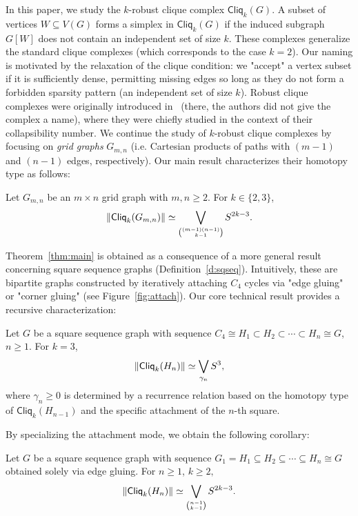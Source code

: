 \documentclass[a4paper, v2021]{lipics-v2021}
\theoremstyle{plain}
\theoremstyle{definition}
\newcommand{\Cliq}[2]{\mathsf{Cliq}_{#1}(#2)}
\DeclarePairedDelimiter{\gr}{\lVert}{\rVert}
\begin{document}
In this paper, we study the $k$-robust clique complex $\Cliq{k}{G}$. A subset of vertices $W\subseteq V(G)$ forms a simplex in $\Cliq{k}{G}$ if the induced subgraph $G[W]$ does not contain an independent set of size $k$. These complexes generalize the standard clique complexes (which corresponds to the case $k=2$).
Our naming is motivated by the relaxation of the clique condition: we "accept" a vertex subset if it is sufficiently dense, permitting missing edges so long as they do not form a forbidden sparsity pattern (an independent set of size $k$). Robust clique complexes were originally introduced in~\cite{KimL2022} (there, the authors did not give the complex a name), where they were chiefly studied in the context of their collapsibility number.
We continue the study of $k$-robust clique complexes by focusing on \emph{grid graphs} $G_{m,n}$ (i.e. Cartesian products of paths with $(m-1)$ and $(n-1)$ edges, respectively). Our main result characterizes their homotopy type as follows:

\begin{theorem}\label{thm:main}
Let $G_{m,n}$ be an $m \times n$ grid graph with $m, n \geq 2$. For  $ k\in \{2,3\}$,
\[
 \gr{\Cliq{k}{G_{m,n}}} \simeq \bigvee_{
    \binom{(m-1)(n-1)}{k-1}} S^{2k-3}.
\]
\end{theorem}

Theorem~\ref{thm:main} is obtained as a consequence of a more general result concerning square sequence graphs (Definition~\ref{d:sqseq}). Intuitively, these are bipartite graphs constructed by iteratively attaching $C_4$ cycles via "edge gluing" or "corner gluing" (see Figure~\ref{fig:attach}). Our core technical result provides a recursive characterization:

\begin{theorem}\label{thm:main2}   
Let $G$ be a square sequence graph with sequence $C_4 \cong H_1 \subset  H_2 \subset \cdots \subset H_n \cong G$, $n\geq 1 $. For $k = 3$,
\[
\gr{\Cliq{k}{H_n}} \simeq \bigvee_{\gamma_n} S^{3}, 
\]
where $\gamma_n \geq 0$ is determined by a recurrence relation based on the homotopy type of $\Cliq{k}{H_{n-1}}$ and the specific attachment of the $n$-th square.
\end{theorem}

By specializing the attachment mode, we obtain the following corollary:

\begin{corollary}\label{c:edgeseqeunce}
Let $G$ be a square sequence graph with sequence
$
G_1 = H_1 \subseteq H_2 \subseteq \cdots \subseteq H_{n} \cong G
$
obtained solely via edge gluing. For $n\geq 1$, $k\geq 2,$
\[
    \gr{\Cliq{k}{H_n}} \simeq \bigvee_{\binom{n-1}{k-1}} S^{2k-3}.
\]
\end{corollary}
\end{document}
